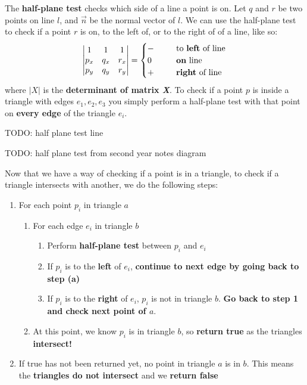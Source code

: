 \documentclass{article}
\begin{document}
The \textbf{half-plane test} checks which side of a line a point is on. Let $q$ and $r$ be two points on line $l$, and $\vec{n}$ be the normal vector of $l$. We can use the half-plane test to check if a point $r$ is on, to the left of, or to the right of of a line, like so:
\begin{equation}
	\begin{vmatrix}
		1 & 1 & 1 \\
		p_x & q_x & r_x \\
		p_y & q_y & r_y
	\end{vmatrix} = \begin{cases}
		- & \;\;\;\;\;\; \text{to \textbf{left} of line} \\
		0 & \;\;\;\;\;\; \text{\textbf{on} line} \\
		+ & \;\;\;\;\;\; \text{\textbf{right} of line} \\
	\end{cases}
	\label{eq:half-plane-test}
\end{equation}
where $|X|$ is the \textbf{determinant of matrix \textit{X}}. To check if a point $p$ is inside a triangle with edges $e_1, e_2, e_3$ you simply perform a half-plane test with that point on \textbf{every edge} of the triangle $e_i$.

TODO: half plane test line

TODO: half plane test from  second year notes diagram

Now that we have a way of checking if a point is in a triangle, to check if a triangle intersects with another, we do the following steps:
\begin{enumerate}
	\item For each point $p_i$ in triangle $a$
	\begin{enumerate}
		\item For each edge $e_i$ in triangle $b$
		\begin{enumerate}
			\item Perform \textbf{half-plane test} between $p_i$ and $e_i$
			\item If $p_i$ is to the \textbf{left} of $e_i$, \textbf{continue to next edge by going back to step (a)}
			\item If $p_i$ is to the \textbf{right} of $e_i$, $p_i$ is not in triangle $b$. \textbf{Go back to step 1 and check next point of $a$}.
		\end{enumerate}
		\item At this point, we know $p_i$ is in triangle $b$, so \textbf{return true} as the triangles \textbf{intersect!}
	\end{enumerate}
	\item If true has not been returned yet, no point in triangle $a$ is in $b$. This means the \textbf{triangles do not intersect} and we \textbf{return false}
\end{enumerate}
\end{document}
